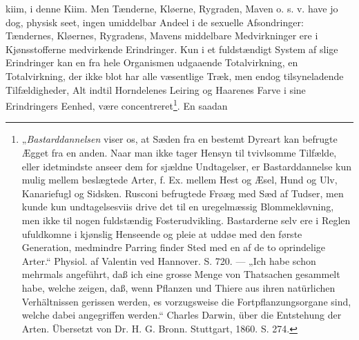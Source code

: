 \documentclass[12pt,a4paper]{book}
\begin{document}
\setcounter{footnote}{0}
kiim, i denne Kiim. Men Tænderne, Kløerne, Rygraden, Maven o. s. v. have
jo dog, physisk seet, ingen umiddelbar Andeel i de sexuelle Afsondringer:
Tændernes, Kløernes, Rygradens, Mavens middelbare Medvirkninger ere i
Kjønsstofferne medvirkende Erindringer. Kun i et fuldstændigt System af
slige Erindringer kan en fra hele Organismen udgaaende Totalvirkning, en
Totalvirkning, der ikke blot har alle væsentlige Træk, men endog
tilsyneladende Tilfældigheder, Alt indtil Horndelenes Leiring og Haarenes
Farve i sine Erindringers Eenhed, være
concentreret\footnote{„\emph{Bastarddannelsen} viser os, at Sæden fra en
bestemt Dyreart kan befrugte Ægget fra en anden. Naar man ikke tager
Hensyn til tvivlsomme Tilfælde, eller idetmindste anseer dem for sjældne
Undtagelser, er Bastarddannelse kun mulig mellem beslægtede Arter, f. Ex.
mellem Hest og Æsel, Hund og Ulv, Kanariefugl og Sidsken. Rusconi
befrugtede Frøæg med Sæd af Tudser, men kunde kun undtagelsesviis drive
det til en uregelmæssig Blommekløvning, men ikke til nogen fuldstændig
Fosterudvikling. Bastarderne selv ere i Reglen ufuldkomne i kjønslig
Henseende og pleie at uddøe med den første Generation, medmindre Parring
finder Sted med en af de to oprindelige Arter.“ Physiol. af Valentin ved
Hannover. S. 720. --- „Ich habe schon mehrmals angeführt, daß ich eine
grosse Menge von Thatsachen gesammelt habe, welche zeigen, daß, wenn
Pflanzen und Thiere aus ihren natürlichen Verhältnissen gerissen werden,
es vorzugsweise die Fortpflanzungsorgane sind, welche dabei angegriffen
werden.“ Charles Darwin, über die Entstehung der Arten. Übersetzt von Dr.
H. G. Bronn. Stuttgart, 1860. S. 274.}. En saadan
\end{document}

